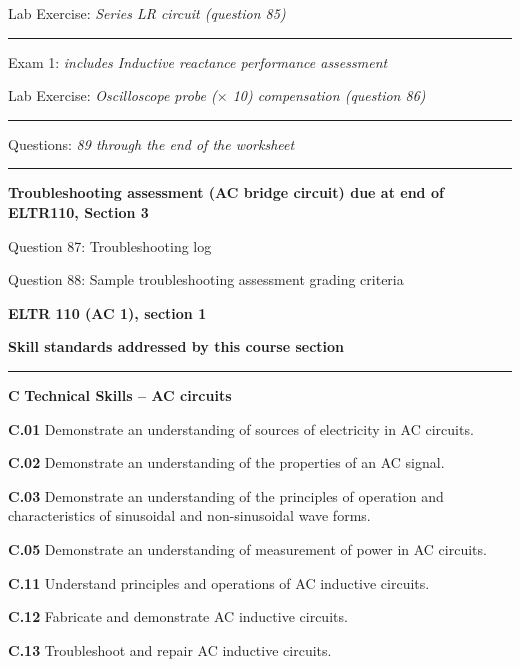 \hskip 10pt Lab Exercise: {\it Series LR circuit (question 85)}
 
\vskip 10pt
\hrule \vskip 5pt
\noindent
{}

\hskip 10pt Exam 1: {\it includes Inductive reactance performance assessment}
 
\hskip 10pt Lab Exercise: {\it Oscilloscope probe ($\times$ 10) compensation (question 86)}

\vskip 10pt
\hrule \vskip 5pt
\noindent
{}

\hskip 10pt Questions: {\it 89 through the end of the worksheet}
 
\vskip 10pt
\hrule \vskip 5pt
\noindent
{}

\hskip 10pt {\bf Troubleshooting assessment (AC bridge circuit) due at end of ELTR110, Section 3}
 
\hskip 10pt Question 87: Troubleshooting log
 
\hskip 10pt Question 88: Sample troubleshooting assessment grading criteria
 
\vskip 10pt







\vfil \eject

\centerline{\bf ELTR 110 (AC 1), section 1} \bigskip 
 
\vskip 10pt

\noindent
{\bf Skill standards addressed by this course section}

\vskip 5pt

\hrule \vskip 10pt
\noindent
{}

\vskip 5pt

\medskip
\item{\bf C} {\bf Technical Skills -- AC circuits}
\item{\bf C.01} Demonstrate an understanding of sources of electricity in AC circuits.
\item{\bf C.02} Demonstrate an understanding of the properties of an AC signal.
\item{\bf C.03} Demonstrate an understanding of the principles of operation and characteristics of sinusoidal and non-sinusoidal wave forms.
\item{\bf C.05} Demonstrate an understanding of measurement of power in AC circuits.
\item{\bf C.11} Understand principles and operations of AC inductive circuits.
\item{\bf C.12} Fabricate and demonstrate AC inductive circuits.
\item{\bf C.13} Troubleshoot and repair AC inductive circuits.
\medskip

